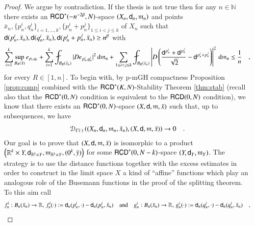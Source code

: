 \documentclass[11pt,reqno]{amsart}
\newcommand{\mm}{\mathfrak m}
\newcommand{\sfd}{{\sf d}}
\renewcommand{\d}{{\rm{d}}}
\newcommand{\R}{\mathbb{R}}
\newcommand{\N}{\mathbb{N}}
\newcommand{\RCD}{{\sf RCD}}
\newcommand{\DC}{\mathcal D_{C(\cdot)}}
\theoremstyle{definition}
\theoremstyle{remark}
\theoremstyle{remark}
\theoremstyle{remark}
\theoremstyle{remark}
\theoremstyle{remark}
\theoremstyle{remark}
\theoremstyle{remark}
\begin{document}
\begin{proof}
We argue by contradiction. If the thesis is not true then  for any $n \in \N$ there exists an  $\RCD^*(-n^{-2\beta}, N)$-space $(X_n, \sfd_n, \mm_n)$  and points  $\bar{x}_n, \{p^i_n,q^i_n\}_{i=1,\ldots, k}, \{p^i_n+p^j_n\}_{1\leq i< j \leq k}$ of $X_n$ such that $\sfd(p^i_n,\bar{x}_n), \sfd(q^i_n,\bar{x}_n),  \sfd(p^i_n+p^j_n,\bar{x}_n)\geq n^{\beta}$ with
\begin{equation}\label{eq:assn}
\sum_{i=1}^{k} \sup_{B_R(\bar{x})} e_{p_{i},q_{i}} + \sum_{i=1}^k \fint _{B_R(\bar{x}_n)} |D e_{p^i_n,q^i_n}|^2 \, \d \mm_n +\sum_{1\leq i< j\leq k} \fint_{B_R(\bar{x}_n)}  \left|D \left( \frac{\sfd^{p^i_n}+\sfd^{p^j_n}} {\sqrt 2} - \sfd^{p^i_n+p^j_n}\right) \right|^2 \, \d \mm_n   \leq \frac{1}{n}  \quad,   
\end{equation}
for every  $R\in[1,n]$.
To begin with, by p-mGH compactness Proposition \ref{prop:comp}  combined with the $\RCD^*(K,N)$-Stability Theorem \ref{thm:stab} (recall also that the $\RCD^*(0,N)$ condition is equivalent to the $\RCD(0,N)$ condition), we know that there exists an $\RCD^*(0,N)$-space $(X,\sfd,\mm, \bar{x})$ such that, up to subsequences,  we have
 \begin{equation}\label{eq:XntoX}
 \DC\left( (X_n, \sfd_n, \mm_n, \bar{x}_n), (X, \sfd, \mm, \bar{x})\right) \to  0 \quad.
 \end{equation}
Our goal is to prove that $(X, \sfd, \mm, \bar{x})$ is isomorphic to a product $\left(\R^k\times Y, \sfd_{\R^k\times Y}, \mm_{\R^k\times Y}, (0^k,\bar{y})\right)$ for some $\RCD^*(0,N-k)$-space $(Y,\sfd_Y, \mm_Y)$. The strategy is to use the distance functions together with the excess estimates in order to construct in the limit space $X$ a kind of ``affine'' functions which play an analogous role of the Busemann functions in the proof of the splitting theorem.  To this aim call 
 \begin{equation}\label{def:fngn}
 \begin{split}
&f^i_n: B_n(\bar{x}_n)\to \R, \, f^i_n(\cdot):=\sfd_n(p^i_n, \cdot)-\sfd_n(p^i_n, \bar{x}_n) \quad\text{and} \quad g^i_n: B_n(\bar{x}_n)\to \R, \,g^i_n(\cdot):=\sfd_n(q^i_n, \cdot)-\sfd_n(q^i_n, \bar{x}_n) \quad,   \\

\end{split}
\end{equation}
\end{proof}
\end{document}

